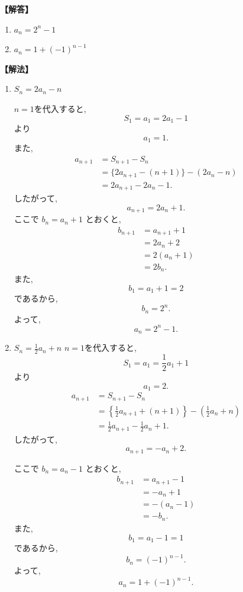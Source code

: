\documentclass[dvipdfmx,a4paper,11pt,fleqn,openany]{jsbook}
\begin{document}
      \noindent\textbf{【解答】}
      \begin{enumerate}[label=(\arabic*),parsep=3pt]
        \item $\displaystyle a_n=2^n-1$
        \item $\displaystyle a_n=1+(-1)^{n-1}$
      \end{enumerate}

      \noindent\textbf{【解法】}
      \begin{enumerate}[label=(\arabic*),parsep=3pt]
      \item $\displaystyle S_n=2a_n-n$

          $n=1$を代入すると,
          \[
            S_1=a_1=2a_1-1
          \]
          より
          \[
            a_1=1.
          \]
          また,
          \begin{align*}
            a_{n+1}
              &=S_{n+1}-S_n\\
              &=\{2a_{n+1}-(n+1)\}-(2a_n-n)\\
              &=2a_{n+1}-2a_n-1.
          \end{align*}
          したがって,
          \[
            a_{n+1}=2a_n+1.
          \]
          ここで $b_n=a_n+1$ とおくと,
          \begin{align*}
            b_{n+1}
              &=a_{n+1}+1\\
              &=2a_n+2\\
              &=2(a_n+1)\\
              &=2b_n.
          \end{align*}
          また,
          \[
            b_1=a_1+1=2
          \]
          であるから,
          \[
            b_n=2^n.
          \]
          よって,
          \[
            a_n=2^n-1.
          \]
      \item $\displaystyle S_n=\frac12a_n+n$
          $n=1$を代入すると,
          \[
            S_1=a_1=\frac12a_1+1
          \]
          より
          \[
            a_1=2.
          \]
          \begin{align*}
            a_{n+1}
              &=S_{n+1}-S_n\\
              &=\left\{\frac12a_{n+1}+(n+1)\right\}
                -\left(\frac12a_n+n\right)\\
              &=\frac12a_{n+1}-\frac12a_n+1.
          \end{align*}
          したがって,
          \[
            a_{n+1}=-a_n+2.
          \]

          ここで $b_n=a_n-1$ とおくと,
          \begin{align*}
            b_{n+1}
              &=a_{n+1}-1\\
              &=-a_n+1\\
              &=-(a_n-1)\\
              &=-b_n.
          \end{align*}
          また,
          \[
            b_1=a_1-1=1
          \]
          であるから,
          \[
            b_n=(-1)^{n-1}.
          \]
          よって,
          \[
            a_n=1+(-1)^{n-1}.
          \]

      \end{enumerate}
\end{document}
